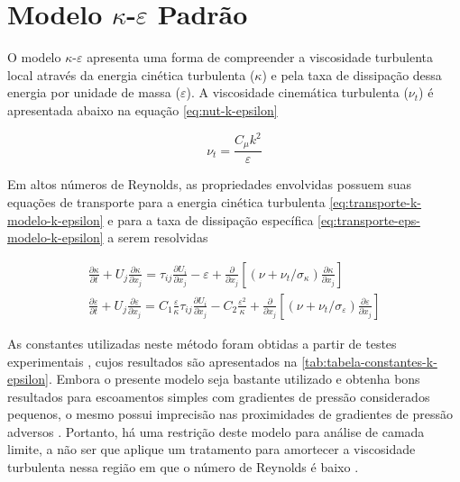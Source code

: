\section{Modelo \texorpdfstring{$\kappa$-$\varepsilon$}{k-e} Padrão}

O modelo $\kappa$-$\varepsilon$ \cite{JONES1972301,LAUNDER1974269,launder1974} apresenta uma forma de compreender a viscosidade turbulenta local através da energia cinética turbulenta ($\kappa$) e pela taxa de dissipação dessa energia por unidade de massa ($\varepsilon$). A viscosidade cinemática turbulenta ($\nu_t$) é apresentada abaixo na equação \ref{eq:nut-k-epsilon}

\begin{equation}
    \nu_t = \frac{C_\mu k^2}{\varepsilon}
    \label{eq:nut-k-epsilon}
\end{equation}

Em altos números de Reynolds, as propriedades envolvidas possuem suas equações de transporte para a energia cinética turbulenta \ref{eq:transporte-k-modelo-k-epsilon} e para a taxa de dissipação específica \ref{eq:transporte-eps-modelo-k-epsilon} a serem resolvidas \cite{Wilcox2006}

\begin{gather}
    \frac{\partial \kappa}{\partial t} + U_{j} \frac{\partial \kappa}{\partial x_j} = \tau_{ij}\frac{\partial U_i}{\partial x_j} - \varepsilon + \frac{\partial}{\partial x_j}\left[\left(\nu + \nu_{t}/\sigma_{\kappa}\right)\frac{\partial \kappa}{\partial x_j}\right]
    \label{eq:transporte-k-modelo-k-epsilon}
    \\
   	\frac{\partial \varepsilon}{\partial t} + U_{j} \frac{\partial \varepsilon}{\partial x_j} = C_{1}\frac{\varepsilon}{\kappa}\tau_{ij}\frac{\partial U_i}{\partial x_j} - C_{2}\frac{\varepsilon^{2}}{\kappa} + \frac{\partial}{\partial x_j}\left[\left(\nu + \nu_{t}/\sigma_{\varepsilon}\right)\frac{\partial \varepsilon}{\partial x_j}\right]
    \label{eq:transporte-eps-modelo-k-epsilon}
\end{gather}
	
As constantes utilizadas neste método foram obtidas a partir de testes experimentais \cite{JONES1972301}, cujos resultados são apresentados na \autoref{tab:tabela-constantes-k-epsilon}. Embora o presente modelo seja bastante utilizado e obtenha bons resultados para escoamentos simples com gradientes de pressão considerados pequenos, o mesmo possui imprecisão nas proximidades de gradientes de pressão adversos \cite{Wilcox1988ReassessmentOT}. Portanto, há uma restrição deste modelo para análise de camada limite, a não ser que aplique um tratamento para amortecer a viscosidade turbulenta nessa região em que o número de Reynolds é baixo \cite{Moukalled2015}.

